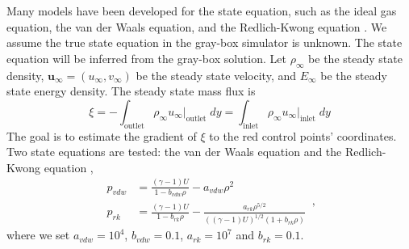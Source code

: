 Many models have been developed for the state equation, such as the ideal gas equation, the
van der Waals equation, and the Redlich-Kwong equation \cite{state eqns}.
We assume the true state equation in the gray-box simulator is unknown. 
The state equation will be inferred from the gray-box solution. 
Let $\rho_\infty$ be the steady state density,
$\boldsymbol{u}_\infty = (u_\infty, v_\infty)$ be the steady state velocity,
and $E_\infty$ be the steady state energy density.
The steady state mass flux is
\begin{equation}
    \xi = - \int_{\textrm{outlet}} \rho_\infty u_\infty \big|_{\textrm{outlet}} \; dy=
    \int_{\textrm{inlet}} \rho_\infty u_\infty\big|_{\textrm{inlet}} \; dy
    \label{eqn: mass flux}
\end{equation}
The goal is to estimate the gradient of $\xi$
to the red control points' coordinates.
\\

Two state equations are tested: the van der Waals equation and the Redlich-Kwong equation
\cite{aero book, Redlich Kwong},
\begin{equation}\begin{split}
    p_{vdw} &= \frac{(\gamma-1)U}{1-b_{vdw}\rho} - a_{vdw}\rho^2\\
    p_{rk} &= \frac{(\gamma-1)U}{1-b_{rk}\rho} - 
    \frac{a_{rk}\rho^{5/2}}{((\gamma-1)U)^{1/2}(1+b_{rk}\rho)}
\end{split}\,,\label{NS state equations}
\end{equation}
where we set $a_{vdw}=10^4$, $b_{vdw}=0.1$, $a_{rk}=10^7$ and $b_{rk}=0.1$.\\

